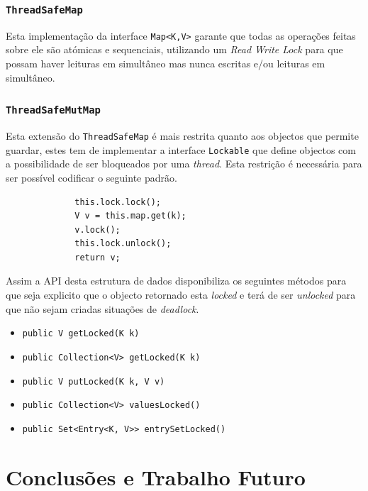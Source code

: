 \documentclass[a4paper]{article}
\begin{document}
\subsubsection{\texttt{ThreadSafeMap}}

Esta implementação da interface \texttt{Map<K,V>} garante que todas as operações feitas sobre ele são atómicas e sequenciais, utilizando um \textit{Read Write Lock} para que possam haver leituras em simultâneo mas nunca escritas e/ou leituras em simultâneo.

\subsubsection{\texttt{ThreadSafeMutMap}}

Esta extensão do \texttt{ThreadSafeMap} é mais restrita quanto aos objectos que permite guardar, estes tem de implementar a interface \texttt{Lockable} que define objectos com a possibilidade de ser bloqueados por uma \textit{thread}. Esta restrição é necessária para ser possível codificar o seguinte padrão.

\begin{figure}[H]
    \begin{verbatim}
        this.lock.lock();
        V v = this.map.get(k);
        v.lock();
        this.lock.unlock();
        return v;
    \end{verbatim}
\end{figure}

Assim a API desta estrutura de dados disponibiliza os seguintes métodos para que seja explicito que o objecto retornado esta \textit{locked} e terá de ser \textit{unlocked} para que não sejam criadas situações de \textit{deadlock}.

\begin{itemize}
    \item \texttt{public V getLocked(K k)}
    \item \texttt{public Collection<V> getLocked(K k)}
    \item \texttt{public V putLocked(K k, V v)}
    \item \texttt{public Collection<V> valuesLocked()}
    \item \texttt{public Set<Entry<K, V>> entrySetLocked()}
\end{itemize}

\pagebreak
\section{Conclusões e Trabalho Futuro}
\end{document}
